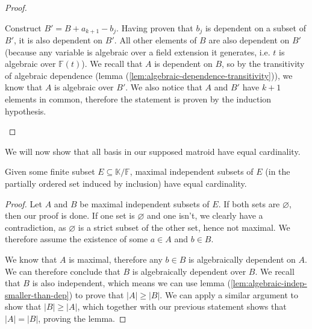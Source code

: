 \begin{proof}
\begin{enumerate}
        Construct $B' = B + a _{k + 1} - b_j$. Having proven that $b_j$ is dependent on a subset of $B'$, it is also dependent on $B'$. All other elements of $B$ are also dependent on $B'$ (because any variable is algebraic over a field extension it generates, i.e. $t$ is algebraic over $\mathbb F(t)$). We recall that $A$ is dependent on $B$, so by the transitivity of algebraic dependence (lemma (\ref{lem:algebraic-dependence-transitivity})), we know that $A$ is algebraic over $B'$. We also notice that $A$ and $B'$ have $k + 1$ elements in common, therefore the statement is proven by the induction hypothesis.
    \end{enumerate}
  \end{proof}

We will now show that all basis in our supposed matroid have equal cardinality.

\begin{lemma}\label{lem:algebraic-matroid-equal-size-basis}
  Given some finite subset $E \subseteq \mathbb K / \mathbb F$, maximal independent subsets of $E$ (in the partially ordered set induced by inclusion) have equal cardinality.
\end{lemma}

\begin{proof}
  Let $A$ and $B$ be maximal independent subsets of $E$. If both sets are $\varnothing$, then our proof is done. If one set is $\varnothing$ and one isn't, we clearly have a contradiction, as $\varnothing$ is a strict subset of the other set, hence not maximal. We therefore assume the existence of some $a \in A$ and $b \in B$. 

  We know that $A$ is maximal, therefore any $b \in B$ is algebraically dependent on $A$. We can therefore conclude that $B$ is algebraically dependent over $B$. We recall that $B$ is also independent, which means we can use lemma (\ref{lem:algebraic-indep-smaller-than-dep}) to prove that $|A| \geq |B|$. We can apply a similar argument to show that $|B| \geq |A|$, which together with our previous statement shows that $|A| = |B|$, proving the lemma.
\end{proof}

